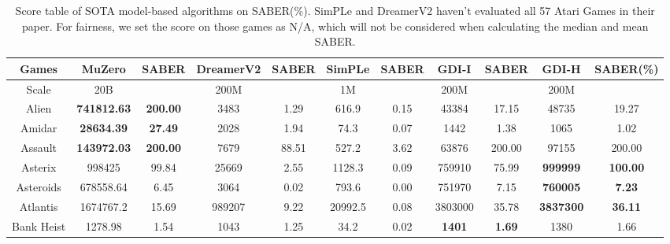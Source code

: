 \documentclass[nohyperref]{article}
\newcommand{\best}[1]{\textbf{#1}}
\theoremstyle{plain}
\begin{document}
\begin{table}[!hb]
\footnotesize
\begin{center}
\caption{Score table of  SOTA  model-based algorithms on SABER(\%). SimPLe \citep{modelbasedatari} and DreamerV2 \citep{dreamerv2} haven't evaluated all 57 Atari Games in their paper. For fairness, we set the score on those games as N/A, which will not be considered when calculating the median and mean SABER.}
\label{Tab: Score table of  SOTA  model-based algorithms on SABER.}
\setlength{\tabcolsep}{1.0pt}
\begin{tabular}{|c |c c| c c| c c| c c| c c| }
\hline
 Games              & MuZero         & SABER      & DreamerV2 & SABER   & SimPLe             & SABER          & GDI-I     & SABER & GDI-H & SABER(\%)\\
\hline
Scale               & 20B            &              & 200M      &            & 1M               &                  & 200M     & &  200M   & \\
\hline
 Alien              & \textbf{741812.63}      & \textbf{200.00  }     &3483       & 1.29     &616.9     & 0.15    & 43384                       &  17.15      &48735    &19.27   \\
 Amidar             & \textbf{28634.39 }      & \textbf{27.49   }  &2028       & 1.94     &74.3      & 0.07    & 1442                           &  1.38       &1065     &1.02          \\
 Assault            & \textbf{143972.03}      & \textbf{200.00 }     &7679       & 88.51       &527.2     & 3.62       & 63876                  &  200.00     &97155     &200.00    \\
 Asterix            & 998425         & 99.84        &25669      & 2.55     &1128.3    & 0.09       & 759910                     &  75.99      &\textbf{999999}            &\textbf{100.00}    \\
 Asteroids          & 678558.64               & 6.45        &3064                & 0.02    &793.6              & 0.00           &751970         & 7.15   &\textbf{760005}            &\textbf{7.23}   \\
 Atlantis           & 1674767.2               & 15.69           &989207              & 9.22       &20992.5            & 0.08    &3803000    & 35.78  &\textbf{3837300}           &\textbf{36.11} \\
 Bank Heist         & 1278.98                 & 1.54        &1043                & 1.25    &34.2               & 0.02    &\best{1401}           & \best{1.69  } &1380              &1.66   \\

\end{tabular}
\end{center}
\end{table}
\end{document}
